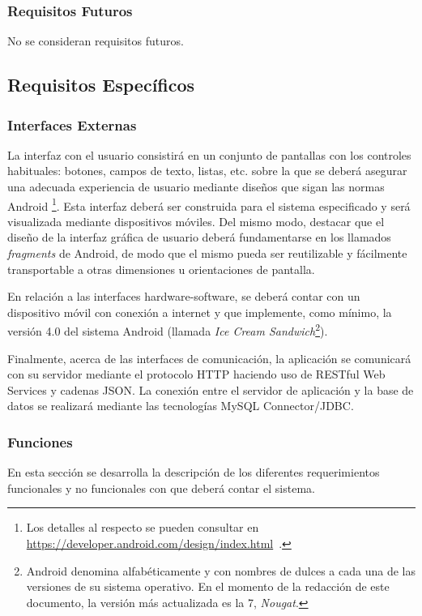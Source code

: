 \subsubsection{Requisitos Futuros}

No se consideran requisitos futuros.

\subsection{Requisitos Específicos}

\subsubsection{Interfaces Externas}

La interfaz con el usuario consistirá en un conjunto de pantallas con los controles habituales: botones, campos de texto, listas, etc. sobre la que se deberá asegurar una adecuada experiencia de usuario mediante diseños que sigan las normas Android \footnote{Los detalles al respecto se pueden consultar en \url{https://developer.android.com/design/index.html}~\cite{AnDev}.}. Esta interfaz deberá ser construida para el sistema especificado y será visualizada mediante dispositivos móviles. Del mismo modo, destacar que el diseño de la interfaz gráfica de usuario deberá fundamentarse en los llamados \emph{fragments} de Android, de modo que el mismo pueda ser reutilizable y fácilmente transportable a otras dimensiones u orientaciones de pantalla.

En relación a las interfaces hardware-software, se deberá contar con un dispositivo móvil con conexión a internet y que implemente, como mínimo, la versión 4.0 del sistema Android (llamada \emph{Ice Cream Sandwich}\footnote{Android denomina alfabéticamente y con nombres de dulces a cada una de las versiones de su sistema operativo. En el momento de la redacción de este documento, la versión más actualizada es la 7, \textit{Nougat}.}).

Finalmente, acerca de las interfaces de comunicación, la aplicación se comunicará con su servidor mediante el protocolo HTTP haciendo uso de RESTful Web Services y cadenas JSON. La conexión entre el servidor de aplicación y la base de datos se realizará mediante las tecnologías MySQL Connector/JDBC.
\subsubsection{Funciones}

En esta sección se desarrolla la descripción de los diferentes requerimientos funcionales y no funcionales con que deberá contar el sistema. 

